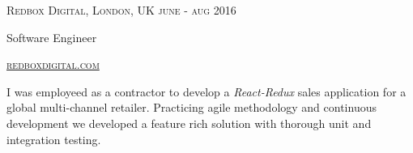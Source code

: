
\raggedright

\textsc{\small{
	Redbox Digital, London, UK
   	\hfill	
   	{\raggedleft june - aug 2016}
}}
  
{\large Software Engineer}

\textsc{\small\href{http://www.redboxdigital.com}{redboxdigital.com}}

I was employeed as a contractor to develop a \emph{React-Redux} sales application for a global multi-channel retailer. Practicing agile methodology and continuous development we developed a feature rich solution with thorough unit and integration testing. 